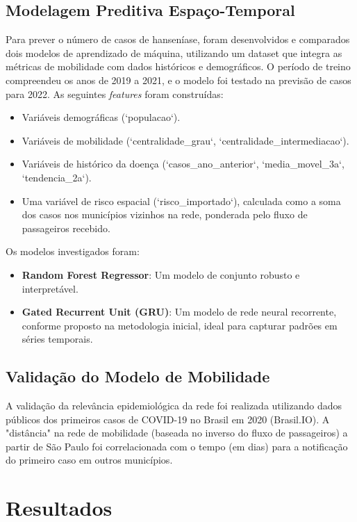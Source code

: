 \documentclass[preprint,12pt]{elsarticle}
\begin{document}
\subsection{Modelagem Preditiva Espaço-Temporal}
Para prever o número de casos de hanseníase, foram desenvolvidos e comparados dois modelos de aprendizado de máquina, utilizando um dataset que integra as métricas de mobilidade com dados históricos e demográficos. O período de treino compreendeu os anos de 2019 a 2021, e o modelo foi testado na previsão de casos para 2022. As seguintes \textit{features} foram construídas:
\begin{itemize}[label=\textbullet]
    \item Variáveis demográficas (`populacao`).
    \item Variáveis de mobilidade (`centralidade\_grau`, `centralidade\_intermediacao`).
    \item Variáveis de histórico da doença (`casos\_ano\_anterior`, `media\_movel\_3a`, `tendencia\_2a`).
    \item Uma variável de risco espacial (`risco\_importado`), calculada como a soma dos casos nos municípios vizinhos na rede, ponderada pelo fluxo de passageiros recebido.
\end{itemize}
Os modelos investigados foram:
\begin{itemize}[label=\textbullet]
    \item \textbf{Random Forest Regressor}: Um modelo de conjunto robusto e interpretável.
    \item \textbf{Gated Recurrent Unit (GRU)}: Um modelo de rede neural recorrente, conforme proposto na metodologia inicial, ideal para capturar padrões em séries temporais.
\end{itemize}

\subsection{Validação do Modelo de Mobilidade}
A validação da relevância epidemiológica da rede foi realizada utilizando dados públicos dos primeiros casos de COVID-19 no Brasil em 2020 (Brasil.IO). A "distância" na rede de mobilidade (baseada no inverso do fluxo de passageiros) a partir de São Paulo foi correlacionada com o tempo (em dias) para a notificação do primeiro caso em outros municípios.

\section{Resultados}
\end{document}
